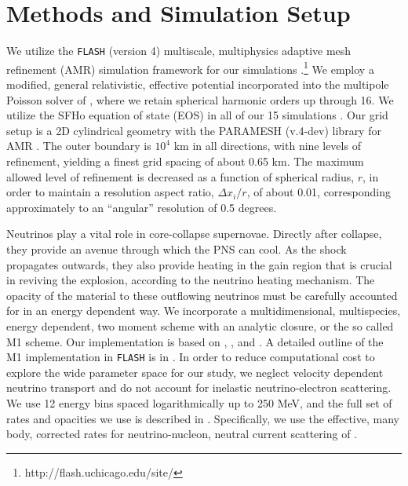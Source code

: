 \documentclass[twocolumn,times]{aastex62}  %
\begin{document}

\section{Methods and Simulation Setup}
\label{sec:method}
We utilize the \texttt{FLASH} (version 4) multiscale, multiphysics adaptive mesh refinement (AMR) simulation framework for our simulations \citep{fryxell:2000,dubey:2009}.\footnote{http://flash.uchicago.edu/site/}  We employ a modified, general relativistic, effective potential \citep{marek:2006, oconnor:2018} incorporated into the multipole Poisson solver of \citet{couch:2013a}, where we retain spherical harmonic orders up through 16.   We utilize the SFHo equation of state (EOS) in all of our 15 simulations \citep{steiner:2013}.  Our grid setup is a 2D cylindrical geometry with the PARAMESH (v.4-dev) library for AMR  \citep{macneice:2000}.  The outer boundary is $10^4$ km in all directions, with nine levels of refinement, yielding a finest grid spacing of about 0.65 km.
The maximum allowed level of refinement is decreased as a function of spherical radius, $r$, in order to maintain a resolution aspect ratio, $\Delta x_i / r$, of about 0.01, corresponding approximately to an ``angular'' resolution of 0.5 degrees.

Neutrinos play a vital role in core-collapse supernovae.  Directly after collapse, they provide an avenue through which the PNS can cool.  As the shock propagates outwards, they also provide heating in the gain region that is crucial in reviving the explosion, according to the neutrino heating mechanism.  The opacity of the material to these outflowing neutrinos must be carefully accounted for in an energy dependent way.  We incorporate a multidimensional, multispecies, energy dependent, two moment scheme with an analytic closure, or the so called M1 scheme.  Our implementation is based on \citet{oconnor:2015}, \citet{shibata:2011}, and \citet{cardall:2013}.  A detailed outline of the M1 implementation in \texttt{FLASH} is in \citet{oconnor:2018}.  In order to reduce computational cost to explore the wide parameter space for our study, we neglect velocity dependent neutrino transport and do not account for inelastic neutrino-electron scattering.
We use 12 energy bins spaced logarithmically up to 250 MeV, and the full set of rates and opacities we use is described in \citet{oconnor:2017a}. 
Specifically, we use the effective, many body, corrected rates
for neutrino-nucleon, neutral current scattering of \citet{horowitz:2017}.  
\end{document}
